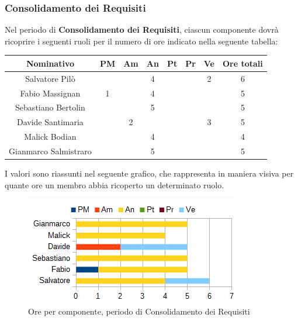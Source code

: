 		\subsubsection{Consolidamento dei Requisiti}
		Nel periodo di \textbf{Consolidamento dei Requisiti}, ciascun componente dovrà ricoprire i seguenti ruoli per il numero di ore indicato nella seguente tabella: \\
		\begin{table}[H]
		\centering
		\begin{tabular}{|c|c|c|c|c|c|c|c|}
			\hline
			\textbf{Nominativo}		& \textbf{PM}	& \textbf{Am}	& \textbf{An}	& \textbf{Pt}	& \textbf{Pr}	& \textbf{Ve}	& \textbf{Ore totali}     \\
			\hline
			Salvatore Pilò			&		& 		& 4		&		&		& 2		& 6 \\
			Fabio Massignan			& 1		& 		& 4		&		&		& 		& 5 \\
			Sebastiano Bertolin		&		& 		& 5		&		&		&		& 5 \\
			Davide Santimaria		&		& 2		&		&		&		& 3		& 5 \\
			Malick Bodian			& 		& 		& 4		&		&		& 		& 4 \\
			Gianmarco Salmistraro	&		& 		& 5		&		&		& 		& 5 \\
			\hline
		\end{tabular}
		\end{table}
		I valori sono riassunti nel seguente grafico, che rappresenta in maniera visiva per quante ore un membro abbia ricoperto un determinato ruolo. \\
		\begin{figure}[H]
			\centering
			\includegraphics[width=1\linewidth]{immagini/grafici/analisi_dettaglio-barra.png}
			\caption{Ore per componente, periodo di Consolidamento dei Requisiti}
		\end{figure}
